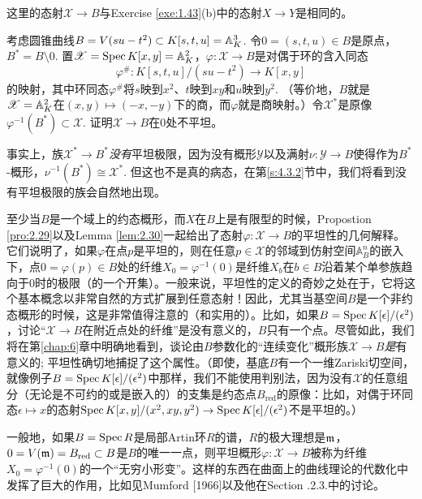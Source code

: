 这里的态射$\mathscr{X}\to B$与Exercise \ref{exe:1.43}(b)中的态射$X\to Y$是相同的。

\begin{exe}
考虑圆锥曲线$B=V(su-t^2)\subset K[s,t,u]=\mathbb{A}_K^3$. 令$0=(s,t,u)\in B$是原点，$B^*=B\setminus {0}$. 置$\mathscr{X}=\operatorname{Spec} K[x,y]=\mathbb{A}_K^2$，$\varphi:\mathscr{X}\to B$是对偶于环的含入同态
\[
	\varphi^{\#}:K[s,t,u]/(su-t^2)\to K[x,y]
\]
的映射，其中环同态$\varphi^{\#}$将$s$映到$x^2$、$t$映到$xy$和$u$映到$y^2$. （等价地，$B$就是$\mathscr{X}=\mathbb{A}_K^2$在$(x,y)\mapsto (-x,-y)$下的商，而$\varphi$就是商映射。）令$\mathscr{X}^*$是原像$\varphi^{-1}(B^*)\subset \mathscr{X}$. 证明$\mathscr{X}\to B$在$0$处不平坦。
\end{exe}

事实上，族$\mathscr{X}^*\to B^*$\textit{没有}平坦极限，因为没有概形$\mathscr{Y}$以及满射$\nu:\mathscr{Y}\to B$使得作为$B^*$\hyp 概形，$\nu^{-1}(B^*)\cong \mathscr{X}^*$. 但这也不是真的病态，在第\ref{s:4.3.2}节中，我们将看到没有平坦极限的族会自然地出现。

至少当$B$是一个域上的约态概形，而$X$在$B$上是有限型的时候，Propostion \ref{pro:2.29}以及Lemma \ref{lem:2.30}一起给出了态射$\varphi:\mathscr{X}\to B$的平坦性的几何解释。它们说明了，如果$\varphi$在点$p$是平坦的，则在任意$p\in\mathscr{X}$的邻域到仿射空间$\mathbb{A}_B^n$的嵌入下，点$0=\varphi(p)\in B$处的纤维$X_0=\varphi^{-1}(0)$是纤维$X_b$在$b\in B$沿着某个单参族趋向于$0$时的极限（的一个开集）。一般来说，平坦性的定义的奇妙之处在于，它将这个基本概念以非常自然的方式扩展到任意态射！因此，尤其当基空间$B$是一个非约态概形的时候，这是非常值得注意的（和实用的）。比如，如果$B=\operatorname{Spec} K[\epsilon]/(\epsilon^2)$，讨论“$\mathscr{X}\to B$在附近点处的纤维”是没有意义的，$B$只有一个点。尽管如此，我们将在第\ref{chap:6}章中明确地看到，谈论由$B$参数化的“连续变化”概形族$\mathscr{X}\to B$\textit{是}有意义的; 平坦性确切地捕捉了这个属性。（即使，基底$B$有一个一维Zariski切空间，就像例子$B=\operatorname{Spec} K[\epsilon]/(\epsilon^2)$中那样，我们不能使用判别法，因为没有$\mathscr{X}$的任意组分（无论是不可约的或是嵌入的）的支集是约态点$B_{\text{red}}$的原像：比如，对偶于环同态$\epsilon\mapsto x$的态射$\operatorname{Spec} K[x,y]/(x^2,xy,y^2)\to \operatorname{Spec} K[\epsilon]/(\epsilon^2)$不是平坦的。）

一般地，如果$B=\operatorname{Spec} R$是局部Artin环$R$的谱，$R$的极大理想是$\mathfrak{m}$，$0=V(\mathfrak{m})=B_{\text{red}}\subset B$是$B$的唯一一点，则平坦概形$\varphi:\mathscr{X}\to B$被称为纤维$X_0=\varphi^{-1}(0)$的一个“无穷小形变”。这样的东西在曲面上的曲线理论的代数化中发挥了巨大的作用，比如见Mumford [1966]以及他在Section \uppercase\expandafter{}.2.3.中的讨论。

